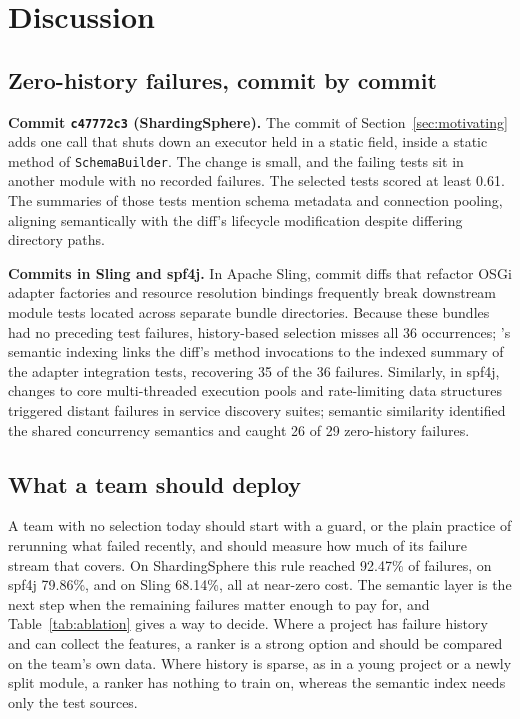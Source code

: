 \section{Discussion}
\label{sec:discussion}

\subsection{Zero-history failures, commit by commit}
\label{sec:cases}

\textbf{Commit \texttt{c47772c3} (ShardingSphere).} The commit of Section~\ref{sec:motivating} adds one call that shuts down an executor held in a static field, inside a static method of \texttt{SchemaBuilder}. The change is small, and the failing tests sit in another module with no recorded failures. The selected tests scored at least 0.61. The summaries of those tests mention schema metadata and connection pooling, aligning semantically with the diff's lifecycle modification despite differing directory paths.

\textbf{Commits in Sling and spf4j.} In Apache Sling, commit diffs that refactor OSGi adapter factories and resource resolution bindings frequently break downstream module tests located across separate bundle directories. Because these bundles had no preceding test failures, history-based selection misses all 36 occurrences; \tool's semantic indexing links the diff's method invocations to the indexed summary of the adapter integration tests, recovering 35 of the 36 failures. Similarly, in spf4j, changes to core multi-threaded execution pools and rate-limiting data structures triggered distant failures in service discovery suites; semantic similarity identified the shared concurrency semantics and caught 26 of 29 zero-history failures.

\subsection{What a team should deploy}

A team with no selection today should start with a guard, or the plain practice of rerunning what failed recently, and should measure how much of its failure stream that covers. On ShardingSphere this rule reached 92.47\% of failures, on spf4j 79.86\%, and on Sling 68.14\%, all at near-zero cost. The semantic layer is the next step when the remaining failures matter enough to pay for, and Table~\ref{tab:ablation} gives a way to decide. Where a project has failure history and can collect the features, a ranker is a strong option and should be compared on the team's own data. Where history is sparse, as in a young project or a newly split module, a ranker has nothing to train on, whereas the semantic index needs only the test sources.

